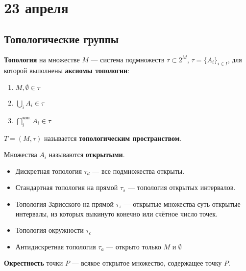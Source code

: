 \chapter{23 апреля}

\section{Топологические группы}

\begin{definition}
	\textbf{Топология} на множестве \(M\) --- система подмножеств
	\(\tau \subset 2^M\), \(\tau = \{A_i\}_{i \in I}\),
	для которой выполнены \textbf{аксиомы топологии}:
	\begin{enumerate}
		\item \(M, \emptyset \in \tau\)
		\item \(\bigcup_i A_i \in \tau\)
		\item \(\bigcap_i^{\text{кон.}} A_i \in \tau\)
	\end{enumerate}
    \(T = (M, \tau)\) называется \textbf{топологическим пространством}.
\end{definition}

\begin{remark}
    Множества \(A_i\) называются \textbf{открытыми}.
\end{remark}

\begin{example}\itemfix
    \begin{itemize}
        \item Дискретная топология \(\tau_d\) --- все подмножества открыты.
        \item Стандартная топология на прямой \(\tau_s\) --- топология открытых интервалов.
        \item Топология Зарисского на прямой \(\tau_z\) --- открытые множества суть
            открытые интервалы, из которых выкинуто конечно или счётное число точек.
        \item Топология окружности \(\tau_c\)
        \item Антидискретная топология \(\tau_a\) --- открыто только \(M\) и  \(\emptyset\)
    \end{itemize}
\end{example}

\begin{definition}
    \textbf{Окрестность} точки \(P\) --- всякое открытое множество, содержащее точку \(P\). 
\end{definition}

